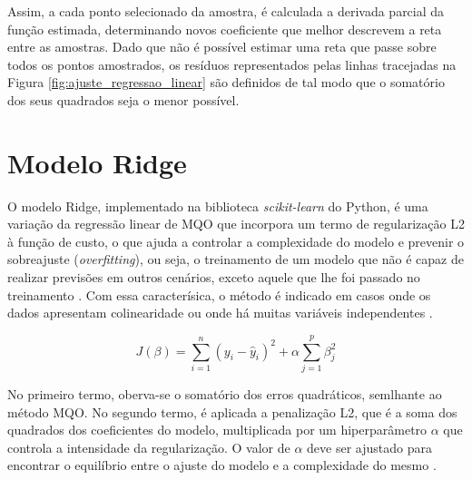 Assim, a cada ponto selecionado da amostra, é calculada a derivada parcial da função estimada, determinando novos coeficiente que melhor descrevem a reta entre as amostras. Dado que não é possível estimar uma reta que passe sobre todos os pontos amostrados, os resíduos representados pelas linhas tracejadas na Figura \ref{fig:ajuste_regressao_linear} são definidos de tal modo que o somatório dos seus quadrados seja o menor possível.

\section{Modelo Ridge}

O modelo Ridge, implementado na biblioteca \textit{scikit-learn} do Python, é uma variação da regressão linear de MQO que incorpora um termo de regularização L2 à função de custo, o que ajuda a controlar a complexidade do modelo e prevenir o sobreajuste (\textit{overfitting}), ou seja, o treinamento de um modelo que não é capaz de realizar previsões em outros cenários, exceto aquele que lhe foi passado no treinamento \cite{ScikitLearnRidge2025}. Com essa caracterísica, o método é indicado em casos onde os dados apresentam colinearidade ou onde há muitas variáveis independentes \cite{Jolly2018}.

\begin{equation}
	J(\beta) = \sum_{i=1}^{n} (y_i - \hat{y}_i)^2 + \alpha \sum_{j=1}^{p} \beta_j^2
\end{equation}

No primeiro termo, oberva-se o somatório dos erros quadráticos, semlhante ao método MQO. No segundo termo, é aplicada a penalização L2, que é a soma dos quadrados dos coeficientes do modelo, multiplicada por um hiperparâmetro $\alpha$ que controla a intensidade da regularização. O valor de $\alpha$ deve ser ajustado para encontrar o equilíbrio entre o ajuste do modelo e a complexidade do mesmo \cite{ScikitLearnRidge2025}.


